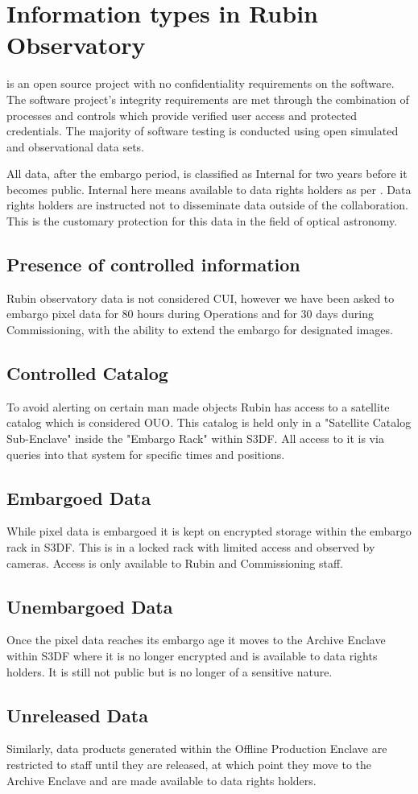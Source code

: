 \section{Information types in Rubin Observatory} \label{sec:infotypes}

\VRO is an open source project with no confidentiality requirements on the software.
The software project’s integrity requirements are met through the combination of
processes and controls which provide verified user access and protected credentials.
The majority of software testing is conducted using open simulated and observational data sets.

All data, after the embargo period,  is classified as Internal for two years before it becomes public.
Internal here means available to data rights holders as per .
Data rights holders are instructed not to disseminate data outside of the collaboration.
This is the customary protection for this data in the field of optical astronomy.

\subsection{Presence of controlled information}\label{sec:cui}
Rubin observatory data is not considered \gls{CUI}, however we have been asked to embargo pixel data for 80 hours during Operations and for 30 days during Commissioning, with the ability to extend the embargo for designated images.

\subsection{Controlled Catalog}\label{sec:controllescat}
To avoid alerting on certain man made objects Rubin has access to a satellite catalog which is considered \gls{OUO}.
This catalog is held only in a "Satellite Catalog Sub-Enclave" inside the "Embargo Rack" within S3DF.
All access to it is via queries into that system for specific times and positions.

\subsection{Embargoed Data} \label{sec:embargo}
While pixel data is embargoed it is kept on encrypted storage within the embargo rack in S3DF.
This is in a locked rack with limited access and observed by cameras.
Access is only available to Rubin and Commissioning staff.

\subsection{Unembargoed Data}
Once the pixel data reaches its embargo age it moves to the Archive Enclave within S3DF where it is no longer encrypted and is available to data rights holders. It is still not public but is no longer of a sensitive nature.

\subsection{Unreleased Data}
Similarly, data products generated within the Offline Production Enclave are restricted to staff until they are released, at which point they move to the Archive Enclave and are made available to data rights holders.
